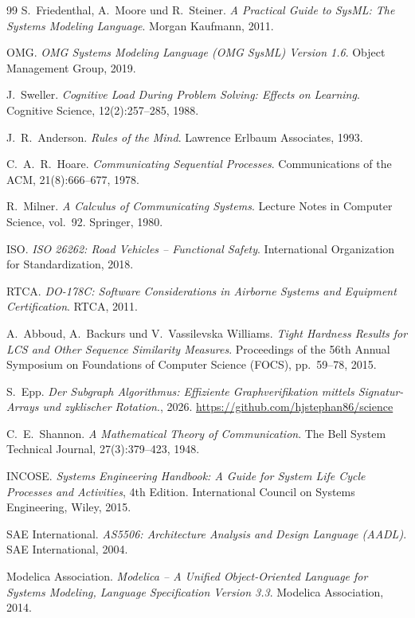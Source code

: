 ﻿\documentclass[a4paper,12pt]{report}
\theoremstyle{definition}
\begin{document}
\begin{thebibliography}{99}
S.~Friedenthal, A.~Moore und R.~Steiner.
\textit{A Practical Guide to SysML: The Systems Modeling Language}.
Morgan Kaufmann, 2011.

OMG.
\textit{OMG Systems Modeling Language (OMG SysML) Version 1.6}.
Object Management Group, 2019.

J.~Sweller.
\textit{Cognitive Load During Problem Solving: Effects on Learning}.
Cognitive Science, 12(2):257--285, 1988.

J.~R.~Anderson.
\textit{Rules of the Mind}.
Lawrence Erlbaum Associates, 1993.

C.~A.~R.~Hoare.
\textit{Communicating Sequential Processes}.
Communications of the ACM, 21(8):666--677, 1978.

R.~Milner.
\textit{A Calculus of Communicating Systems}.
Lecture Notes in Computer Science, vol.~92. Springer, 1980.

ISO.
\textit{ISO 26262: Road Vehicles -- Functional Safety}.
International Organization for Standardization, 2018.

RTCA.
\textit{DO-178C: Software Considerations in Airborne Systems and Equipment
Certification}.
RTCA, 2011.

A.~Abboud, A.~Backurs und V.~Vassilevska Williams.
\textit{Tight Hardness Results for LCS and Other Sequence Similarity Measures}.
Proceedings of the 56th Annual Symposium on Foundations of Computer Science
(FOCS), pp.~59--78, 2015.

S.~Epp.
\textit{Der Subgraph Algorithmus: Effiziente Graphverifikation mittels
Signatur-Arrays und zyklischer Rotation}., 2026.
\url{https://github.com/hjstephan86/science}

C.~E.~Shannon.
\textit{A Mathematical Theory of Communication}.
The Bell System Technical Journal, 27(3):379--423, 1948.

INCOSE.
\textit{Systems Engineering Handbook: A Guide for System Life Cycle Processes
and Activities}, 4th Edition.
International Council on Systems Engineering, Wiley, 2015.

SAE International.
\textit{AS5506: Architecture Analysis and Design Language (AADL)}.
SAE International, 2004.

Modelica Association.
\textit{Modelica -- A Unified Object-Oriented Language for Systems Modeling,
Language Specification Version 3.3}.
Modelica Association, 2014.


\end{thebibliography}
\end{document}
